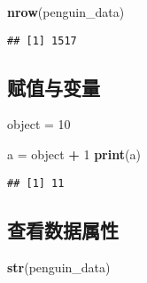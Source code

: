 \documentclass[
]{article}
\newenvironment{Shaded}{\begin{snugshade}}{\end{snugshade}}
\newcommand{\DecValTok}[1]{\textcolor[rgb]{0.00,0.00,0.81}{#1}}
\newcommand{\FunctionTok}[1]{\textcolor[rgb]{0.13,0.29,0.53}{\textbf{#1}}}
\newcommand{\NormalTok}[1]{#1}
\newcommand{\OtherTok}[1]{\textcolor[rgb]{0.56,0.35,0.01}{#1}}
\newcommand{\SpecialCharTok}[1]{\textcolor[rgb]{0.81,0.36,0.00}{\textbf{#1}}}
\begin{document}
\begin{Shaded}
\begin{Highlighting}[]
\FunctionTok{nrow}\NormalTok{(penguin\_data)}
\end{Highlighting}
\end{Shaded}

\begin{verbatim}
## [1] 1517
\end{verbatim}

\subsection{赋值与变量}\label{ux8d4bux503cux4e0eux53d8ux91cf}

\begin{Shaded}
\begin{Highlighting}[]
\NormalTok{object }\OtherTok{=} \DecValTok{10}

\NormalTok{a }\OtherTok{=}\NormalTok{ object }\SpecialCharTok{+} \DecValTok{1}
\FunctionTok{print}\NormalTok{(a)}
\end{Highlighting}
\end{Shaded}

\begin{verbatim}
## [1] 11
\end{verbatim}

\subsection{查看数据属性}\label{ux67e5ux770bux6570ux636eux5c5eux6027}

\begin{Shaded}
\begin{Highlighting}[]
\FunctionTok{str}\NormalTok{(penguin\_data)}
\end{Highlighting}
\end{Shaded}
\end{document}
